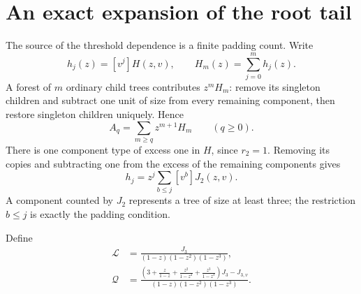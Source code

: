 \documentclass[11pt,letterpaper]{article}
\theoremstyle{definition}\newtheorem{definition}[theorem]{Definition}
\theoremstyle{remark}\newtheorem{remark}[theorem]{Remark}
\newcommand{\Lcal}{\mathcal L}
\newcommand{\Qcal}{\mathcal Q}
\begin{document}
\section{An exact expansion of the root tail}\label{hod:three:sec:root}
The source of the threshold dependence is a finite padding count. Write
\[
h_j(z)=[v^j]H(z,v),\qquad H_m(z)=\sum_{j=0}^m h_j(z).
\]
A forest of $m$ ordinary child trees contributes $z^mH_m$: remove its singleton children and subtract one unit of size from every remaining component, then restore singleton children uniquely. Hence
\begin{equation}\label{hod:three:eq:Aforest}
A_q=\sum_{m\ge q}z^{m+1}H_m\qquad(q\ge0).
\end{equation}
There is one component type of excess one in $H$, since $r_2=1$. Removing its copies and subtracting one from the excess of the remaining components gives
\begin{equation}\label{hod:three:eq:hshift}
h_j=z^j\sum_{b\le j}[v^b]J_2(z,v).
\end{equation}
A component counted by $J_2$ represents a tree of size at least three; the restriction $b\le j$ is exactly the padding condition.

Define
\begin{align}
\Lcal&=\frac{J_3}{(1-z)(1-z^2)(1-z^3)},\label{hod:three:eq:L}\\
\Qcal&=\frac{\left(3+\frac z{1-z}+\frac{z^2}{1-z^2}+\frac{z^3}{1-z^3}\right)J_3-J_{3,v}}
{(1-z)(1-z^2)(1-z^3)}.\label{hod:three:eq:Q}
\end{align}
\end{document}

